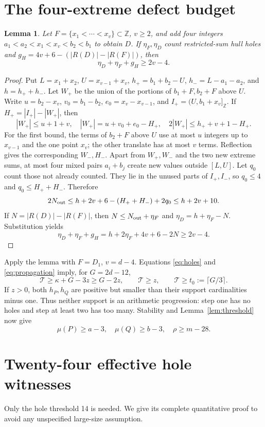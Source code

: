 \documentclass[11pt,a4paper]{article}
\newcommand{\Z}{\mathbb Z}
\newcommand{\T}{\mathcal T}
\newtheorem{lemma}[theorem]{Lemma}
\begin{document}
\section{The four-extreme defect budget}
\begin{lemma}\label{lem:four}
Let $F=\{x_1<\cdots<x_v\}\subset\Z$, $v\ge2$, and add four integers
$a_1<a_2<x_1<x_v<b_2<b_1$ to obtain $D$. If $\eta_F,\eta_D$ count
restricted-sum hull holes and
$g_H=4v+6-(|R(D)|-|R(F)|)$, then
\[
 \eta_D+\eta_F+g_H\ge2v-4.
\]
\end{lemma}
\begin{proof}
Put $L=x_1+x_2$, $U=x_{v-1}+x_v$,
$h_+=b_1+b_2-U$, $h_-=L-a_1-a_2$, and $h=h_++h_-$.
Let $W_+$ be the union of the portions of $b_1+F,b_2+F$ above $U$.
Write $u=b_2-x_v$, $v_0=b_1-b_2$, $e_0=x_v-x_{v-1}$, and
$I_+=(U,b_1+x_v]_{\Z}$. If $H_+=|I_+|-|W_+|$, then
\[
 |W_+|\le u+1+v,\quad |W_+|=u+v_0+e_0-H_+,\quad
 2|W_+|\le h_++v+1-H_+.
\]
For the first bound, the terms of $b_2+F$ above $U$ use at most $u$
integers up to $x_{v-1}$ and the one point $x_v$; the other translate
has at most $v$ terms. Reflection gives the corresponding $W_-,H_-$.
Apart from $W_+,W_-$ and the two new extreme sums, at most four mixed
pairs $a_i+b_j$ create new values outside $[L,U]$. Let $q_0$ count
those not already counted. They lie in the unused parts of $I_+,I_-$,
so $q_0\le4$ and $q_0\le H_++H_-$. Therefore
\[
 2N_{\rm out}\le h+2v+6-(H_++H_-)+2q_0\le h+2v+10.
\]
If $N=|R(D)|-|R(F)|$, then $N\le N_{\rm out}+\eta_F$ and
$\eta_D=h+\eta_F-N$. Substitution yields
\[
 \eta_D+\eta_F+g_H=h+2\eta_F+4v+6-2N\ge2v-4.
\]
\end{proof}
Apply the lemma with $F=D_1$, $v=d-4$. Equations
\eqref{eq:holes} and \eqref{eq:propagation} imply, for $G=2d-12$,
\begin{equation}\label{eq:Tlower}
 \boxed{\T\ge\kappa+G-3z\ge G-2z,\qquad
 \T\ge z,\qquad\T\ge t_0:=\lceil G/3\rceil.}
\end{equation}
If $z>0$, both $h_P,h_Q$ are positive but smaller than their support
cardinalities minus one. Thus neither support is an arithmetic progression:
step one has no holes and step at least two has too many. Stability and
Lemma~\ref{lem:threshold} now give
\begin{equation}\label{eq:nonap}
 \mu(P)\ge a-3,\quad\mu(Q)\ge b-3,\quad\rho\ge m-28.
\end{equation}

\section{Twenty-four effective hole witnesses}
Only the hole threshold 14 is needed. We give its complete quantitative
proof to avoid any unspecified large-size assumption.
\end{document}
